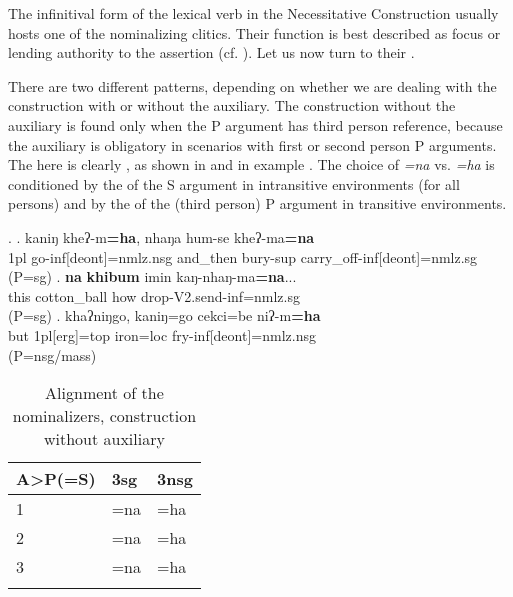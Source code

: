 The infinitival form of the lexical verb  in the Necessitative Construction usually hosts one of the nominalizing clitics. Their  function is best described as focus or lending authority to the assertion (cf. ). Let us now turn to their . 

There are two different  patterns, depending on whether we are dealing with the construction  with or without the auxiliary. The construction without the auxiliary is  found only when the P argument has third person reference, because the auxiliary is obligatory in scenarios with first or second person P arguments. The   here is clearly , as shown in  and in example \Next. The choice of \emph{=na} vs. \emph{=ha} is conditioned by the  of the S argument in intransitive environments (for all persons) and by the  of the (third person) P argument in transitive environments. 


\ex. \ag. kaniŋ kheʔ-m{\bf =ha},                       nhaŋa   hum-se         kheʔ-ma{\bf =na}\\
{\sc 1pl} go{\sc -inf[deont]=nmlz.nsg} and\_then bury{\sc -sup} carry\_off{\sc -inf[deont]=nmlz.sg}\\
 (P=sg) 
\bg. {\bf na}   {\bf khibum}  imin kaŋ-nhaŋ-ma{\bf =na}...\\
this cotton\_ball how drop-{\sc V2.send-inf=nmlz.sg} \\
 (P=sg)  
\bg.  khaʔniŋgo, kaniŋ=go       cekci=be    niʔ-m{\bf =ha} \\
but {\sc 1pl[erg]=top}  iron{\sc =loc} fry-{\sc inf[deont]=nmlz.nsg} \\
 (P=nsg/mass) 


\begin{table}[htp]
\begin{center}
\begin{tabular}{lll}
\lsptoprule
{\bf A>P(=S)} 	&	{\sc 3sg}&{\sc 3nsg}\\
\midrule
1		&=na &  =ha\\
\midrule
2		&=na& =ha\\
\midrule
3		&=na&=ha\\
\lspbottomrule
\end{tabular}
\caption{Alignment of the nominalizers, construction without auxiliary}\label{nom-align-without}
\end{center}
\end{table}
 
